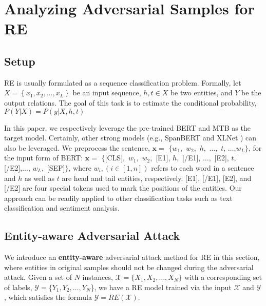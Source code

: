 \documentclass[sigconf]{acmart}
\begin{document}
\section{Analyzing Adversarial Samples for RE}
\subsection{Setup}
RE is usually formulated as a sequence classification problem. 
Formally, let $X=\left\{x_{1}, x_{2}, \ldots, x_{L}\right\}$ be an input sequence, $h,t \in X$ be two entities, and $Y$ be the output relations. 
The goal of this task is to estimate the conditional probability, $P(Y|X) = P(y|X,h,t)$

In this paper, we respectively leverage the pre-trained BERT \cite{bert} and MTB \cite{baldini-soares-etal-2019-matching} as the target model. 
Certainly, other strong models (e.g., SpanBERT \cite{DBLP:journals/tacl/JoshiCLWZL20} and XLNet \cite{DBLP:conf/nips/YangDYCSL19}) can also be leveraged. 
We preprocess the sentence, $\mathbf{x}=$ $\{w_1,$ $w_2,$ $h,$ $\dots,$ $t$, $\dots$,$w_L\}$, for the input form of BERT: $\mathbf{x}=$ $\{$[CLS]$,$ $w_1,$ $w_2,$ [E1], $h,$ [/E1], $\dots,$ [E2], $t,$ [/E2],..., $w_L,$ [SEP]$\}$, where $w_i, (i \in  [1, n])$ refers to each word in a sentence and $h$ as well as $t$ are head and tail entities, respectively. [E1], [/E1], [E2], and [/E2] are four special tokens used to mark the positions of the entities. 
Our approach can be readily applied to other classification tasks such as text classification and sentiment analysis. 

\subsection{Entity-aware Adversarial Attack}
We introduce an \textbf{entity-aware} adversarial attack method for RE in this section, where entities in original samples should not be changed during the adversarial attack.
Given a set of $N$ instances, $\mathcal{X}= \{X_1, X_2,\dots, X_N\}$ with a corresponding set of labels, $\mathcal{Y}=\{Y_1, Y_2,\dots, Y_N$\}, we have a RE model trained via the input $\mathcal{X}$ and $\mathcal{Y}$, which satisfies the formula $ \mathcal{Y}  = RE(\mathcal{X})$.
\end{document}
